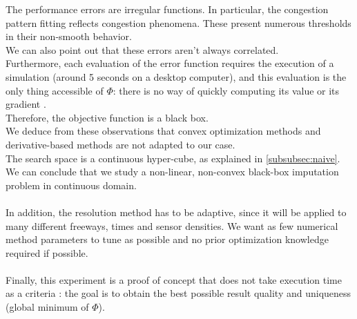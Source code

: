 \color{black}

The performance errors are irregular functions. In particular, the congestion pattern fitting reflects congestion phenomena. These present numerous thresholds in their non-smooth behavior.\\
We can also point out that these errors aren't always correlated.\\
Furthermore, each evaluation of the error function requires the execution of a simulation (around 5 seconds on a desktop computer), and this evaluation is the only thing accessible of $\Phi$: there is no way of quickly computing its value or its gradient .\\
Therefore, the objective function is a black box.\\
We deduce from these observations that convex optimization methods and derivative-based methods are not adapted to our case.\\
The search space is a continuous hyper-cube, as explained in \ref{subsubsec:naive}.\\
We can conclude that we study a non-linear, non-convex black-box imputation problem in continuous domain.\\
\\ 	
In addition, the resolution method has to be adaptive, since it will be applied to many different freeways, times and sensor densities. We want as few numerical method parameters to tune as possible and  no prior optimization knowledge required if possible.\\
\\
Finally, this experiment is a proof of concept that does not take execution time as a criteria : the goal is to obtain the best possible result quality and uniqueness (global minimum of $\Phi$).
